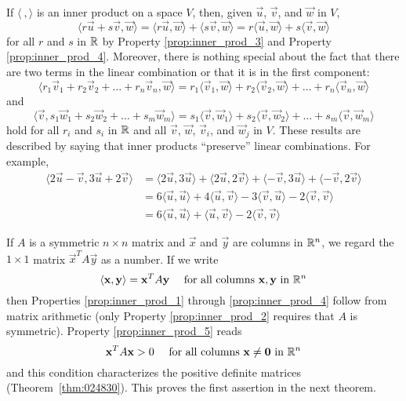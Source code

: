 \documentclass{ximera}
\begin{document}
If $\langle\ , \rangle$ is an inner product on a space $V$, then, given $\vec{u}$, $\vec{v}$, and $\vec{w}$ in $V$,
\begin{equation*}
\langle r\vec{u} + s\vec{v}, \vec{w} \rangle = \langle r\vec{u}, \vec{w} \rangle + \langle s\vec{v}, \vec{w} \rangle = r\langle \vec{u}, \vec{w} \rangle + s\langle \vec{v}, \vec{w} \rangle
\end{equation*}
for all $r$ and $s$ in $\mathbb{R}$ by  Property \ref{prop:inner_prod_3} and Property \ref{prop:inner_prod_4}. Moreover, there is nothing special about the fact that there are two terms in the linear combination or that it is in the first component:
\begin{equation*}
\langle r_1\vec{v}_1 + r_2\vec{v}_2 + \dots + r_n\vec{v}_n, \vec{w} \rangle =
r_1\langle \vec{v}_1, \vec{w} \rangle +
r_2\langle \vec{v}_2, \vec{w} \rangle + \dots +
r_n\langle \vec{v}_n, \vec{w} \rangle
\end{equation*}
and
\begin{equation*}
\langle \vec{v}, s_1\vec{w}_1 + s_2\vec{w}_2 + \dots + s_m\vec{w}_m \rangle =
s_1\langle \vec{v}, \vec{w}_1 \rangle +
s_2\langle \vec{v}, \vec{w}_2 \rangle + \dots +
s_m\langle \vec{v}, \vec{w}_m \rangle
\end{equation*}
hold for all $r_{i}$ and $s_{i}$ in $\mathbb{R}$ and all $\vec{v}$, $\vec{w}$, $\vec{v}_{i}$, and $\vec{w}_{j}$ in $V$. These results are described by saying that inner products ``preserve'' linear combinations. For example,
\begin{align*}
\langle 2\vec{u} - \vec{v}, 3\vec{u} + 2\vec{v} \rangle &=
\langle 2\vec{u}, 3\vec{u} \rangle + \langle 2\vec{u}, 2\vec{v} \rangle + \langle -\vec{v}, 3\vec{u} \rangle + \langle -\vec{v}, 2\vec{v} \rangle \\
&= 6 \langle \vec{u}, \vec{u} \rangle + 4 \langle \vec{u}, \vec{v} \rangle -3 \langle \vec{v}, \vec{u} \rangle - 2 \langle \vec{v}, \vec{v} \rangle \\
&= 6 \langle \vec{u}, \vec{u} \rangle + \langle \vec{u}, \vec{v} \rangle - 2 \langle \vec{v}, \vec{v} \rangle
\end{align*}

If $A$ is a symmetric $n \times n$ matrix and $\vec{x}$ and $\vec{y}$ are columns in $\mathbb{R}^n$, we regard the $1 \times 1$ matrix $\vec{x}^{T}A\vec{y}$ as a number. If we write
\begin{equation*}
\langle \mathbf{x}, \mathbf{y} \rangle = \mathbf{x}^TA\mathbf{y} \quad \mbox{ for all columns } \mathbf{x}, \mathbf{y} \mbox{ in } \mathbb{R}^n
\end{equation*}
then  Properties \ref{prop:inner_prod_1} through \ref{prop:inner_prod_4} follow from matrix arithmetic (only Property \ref{prop:inner_prod_2} requires that $A$ is symmetric).  Property \ref{prop:inner_prod_5} reads
\begin{equation*}
\mathbf{x}^TA \mathbf{x} > 0 \quad \mbox{ for all columns } \mathbf{x} \neq \mathbf{0} \mbox{ in } \mathbb{R}^n
\end{equation*}
and this condition characterizes the positive definite matrices  (Theorem~\ref{thm:024830}). This proves the first assertion in the next theorem.
\end{document}
